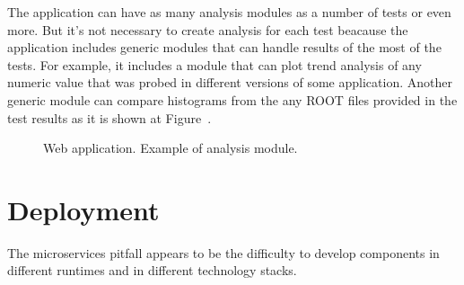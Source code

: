 \documentclass[a4paper]{jpconf}
\begin{document}
The application can have as many analysis modules as a number of tests or even
more. But it's not necessary to create analysis for each test beacause the
application includes generic modules that can handle results of the most of the
tests. For example, it includes a module that can plot trend analysis of any
numeric value that was probed in different versions of some application. Another
generic module can compare histograms from the any ROOT files provided in the
test results as it is shown at Figure~.


\begin{figure}[H]
\centering
{}
\quad
{}
\label{figwebapp}
\caption{Web application. Example of analysis module.}
\end{figure}

\section{Deployment}
The microservices pitfall appears to be the difficulty to develop components in different runtimes and in
different technology stacks.
\end{document}
